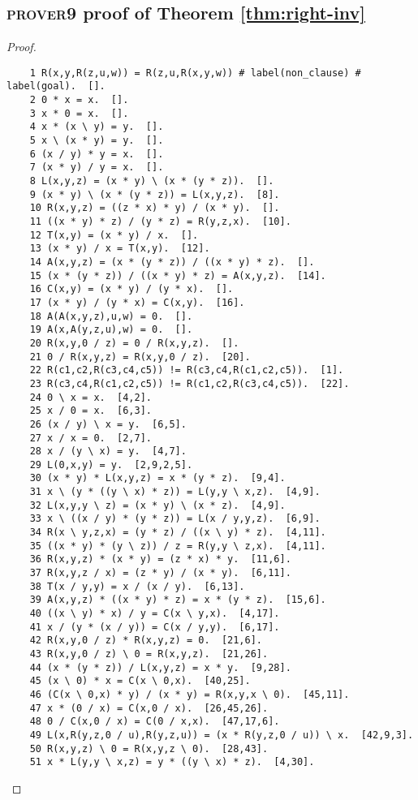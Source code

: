 \documentclass[12pt]{report}
\theoremstyle{definition}
\begin{document}
\subsection{\textsc{prover9} proof of Theorem \ref{thm:right-inv}}
\begin{proof}\label{appendix:right-inv}
  \begin{lstlisting} 
    1 R(x,y,R(z,u,w)) = R(z,u,R(x,y,w)) # label(non_clause) # label(goal).  [].
    2 0 * x = x.  [].
    3 x * 0 = x.  [].
    4 x * (x \ y) = y.  [].
    5 x \ (x * y) = y.  [].
    6 (x / y) * y = x.  [].
    7 (x * y) / y = x.  [].
    8 L(x,y,z) = (x * y) \ (x * (y * z)).  [].
    9 (x * y) \ (x * (y * z)) = L(x,y,z).  [8].
    10 R(x,y,z) = ((z * x) * y) / (x * y).  [].
    11 ((x * y) * z) / (y * z) = R(y,z,x).  [10].
    12 T(x,y) = (x * y) / x.  [].
    13 (x * y) / x = T(x,y).  [12].
    14 A(x,y,z) = (x * (y * z)) / ((x * y) * z).  [].
    15 (x * (y * z)) / ((x * y) * z) = A(x,y,z).  [14].
    16 C(x,y) = (x * y) / (y * x).  [].
    17 (x * y) / (y * x) = C(x,y).  [16].
    18 A(A(x,y,z),u,w) = 0.  [].
    19 A(x,A(y,z,u),w) = 0.  [].
    20 R(x,y,0 / z) = 0 / R(x,y,z).  [].
    21 0 / R(x,y,z) = R(x,y,0 / z).  [20].
    22 R(c1,c2,R(c3,c4,c5)) != R(c3,c4,R(c1,c2,c5)).  [1].
    23 R(c3,c4,R(c1,c2,c5)) != R(c1,c2,R(c3,c4,c5)).  [22].
    24 0 \ x = x.  [4,2].
    25 x / 0 = x.  [6,3].
    26 (x / y) \ x = y.  [6,5].
    27 x / x = 0.  [2,7].
    28 x / (y \ x) = y.  [4,7].
    29 L(0,x,y) = y.  [2,9,2,5].
    30 (x * y) * L(x,y,z) = x * (y * z).  [9,4].
    31 x \ (y * ((y \ x) * z)) = L(y,y \ x,z).  [4,9].
    32 L(x,y,y \ z) = (x * y) \ (x * z).  [4,9].
    33 x \ ((x / y) * (y * z)) = L(x / y,y,z).  [6,9].
    34 R(x \ y,z,x) = (y * z) / ((x \ y) * z).  [4,11].
    35 ((x * y) * (y \ z)) / z = R(y,y \ z,x).  [4,11].
    36 R(x,y,z) * (x * y) = (z * x) * y.  [11,6].
    37 R(x,y,z / x) = (z * y) / (x * y).  [6,11].
    38 T(x / y,y) = x / (x / y).  [6,13].
    39 A(x,y,z) * ((x * y) * z) = x * (y * z).  [15,6].
    40 ((x \ y) * x) / y = C(x \ y,x).  [4,17].
    41 x / (y * (x / y)) = C(x / y,y).  [6,17].
    42 R(x,y,0 / z) * R(x,y,z) = 0.  [21,6].
    43 R(x,y,0 / z) \ 0 = R(x,y,z).  [21,26].
    44 (x * (y * z)) / L(x,y,z) = x * y.  [9,28].
    45 (x \ 0) * x = C(x \ 0,x).  [40,25].
    46 (C(x \ 0,x) * y) / (x * y) = R(x,y,x \ 0).  [45,11].
    47 x * (0 / x) = C(x,0 / x).  [26,45,26].
    48 0 / C(x,0 / x) = C(0 / x,x).  [47,17,6].
    49 L(x,R(y,z,0 / u),R(y,z,u)) = (x * R(y,z,0 / u)) \ x.  [42,9,3].
    50 R(x,y,z) \ 0 = R(x,y,z \ 0).  [28,43].
    51 x * L(y,y \ x,z) = y * ((y \ x) * z).  [4,30].

\end{lstlisting}
\end{proof}
\end{document}
